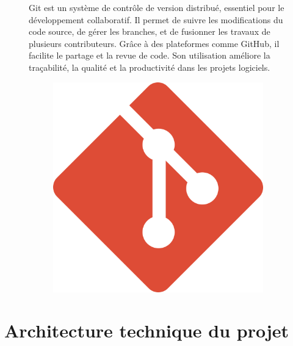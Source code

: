 \documentclass[12pt,a4paper]{report}
\begin{document}
	\begin{figure}[H]
		\begin{minipage}{0.8\textwidth}
			Git est un système de contrôle de version distribué, essentiel pour le développement collaboratif. Il permet de suivre les modifications du code source, de gérer les branches, et de fusionner les travaux de plusieurs contributeurs. Grâce à des plateformes comme GitHub, il facilite le partage et la revue de code. Son utilisation améliore la traçabilité, la qualité et la productivité dans les projets logiciels.
		\end{minipage}
		\hfill
		\begin{minipage}{0.15\textwidth} 
			\begin{figure}[H]
				\centering
				\includegraphics[width=\linewidth]{git-logo.png}
				\label{fig:git-logo}
			\end{figure}
		\end{minipage}
	\end{figure}
	
	\section{Architecture technique du projet}
	
\end{document}
